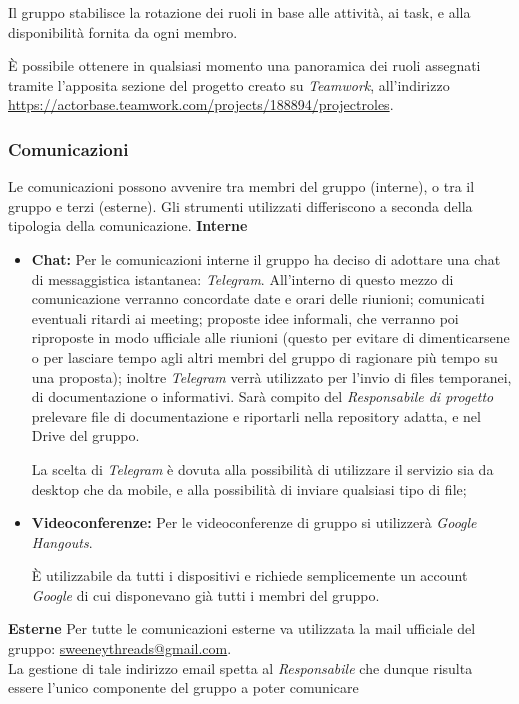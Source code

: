 \documentclass[a4paper]{article}
\begin{document}
		Il gruppo stabilisce la rotazione dei ruoli in base alle attività, ai task, e alla disponibilità fornita da ogni membro.

		È possibile ottenere in qualsiasi momento una panoramica dei ruoli assegnati tramite l'apposita sezione del
		progetto creato su \emph{Teamwork}, all'indirizzo\\ \url{https://actorbase.teamwork.com/projects/188894/projectroles}.
	\subsubsection{Comunicazioni}
	Le comunicazioni possono avvenire tra membri del gruppo (interne), o tra il gruppo e terzi (esterne). Gli
	strumenti utilizzati differiscono a seconda della tipologia della comunicazione.
	\textbf{Interne}
	\begin{itemize}
		\item \textbf{Chat:} Per le comunicazioni interne il gruppo ha deciso di adottare una chat di messaggistica
		istantanea: \emph{Telegram}. All'interno di questo mezzo di comunicazione verranno concordate date e orari
		delle riunioni; comunicati eventuali ritardi ai meeting; proposte idee informali, che verranno poi riproposte
		in modo ufficiale alle riunioni (questo per evitare di dimenticarsene o per lasciare tempo agli altri membri
		del gruppo di ragionare più tempo su una proposta); inoltre \emph{Telegram} verrà utilizzato per l'invio di files
		temporanei, di documentazione o informativi. Sarà compito del \emph{Responsabile di progetto} prelevare file di documentazione
		e riportarli nella repository adatta, e nel Drive del gruppo.

		La scelta di \emph{Telegram} è dovuta alla possibilità di utilizzare il servizio sia da desktop che da mobile, e alla
		possibilità di inviare qualsiasi tipo di file;
		\item \textbf{Videoconferenze:} Per le videoconferenze di gruppo si utilizzerà \emph{Google Hangouts}.

		È utilizzabile da tutti i dispositivi e richiede semplicemente un account \emph{Google} di cui disponevano
		già tutti i membri del gruppo.
	\end{itemize}
	\textbf{Esterne}
	Per tutte le comunicazioni esterne va utilizzata la mail ufficiale del gruppo: \href{mailto:sweeneythreads@gmail.com}{sweeneythreads@gmail.com}.
	 \\ La gestione di tale indirizzo email spetta al \emph{Responsabile} che dunque risulta essere l'unico componente del gruppo a poter comunicare
\end{document}
